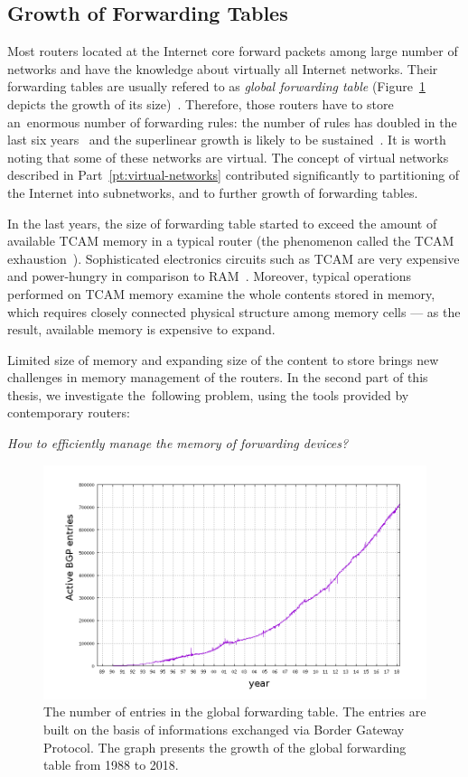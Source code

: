 \subsection{Growth of Forwarding Tables}

Most routers located at the Internet core forward packets among large number of networks and have the knowledge about virtually all Internet networks.
Their forwarding tables are usually refered to as \emph{global forwarding table} (Figure~\ref{fig:bgp-entries} depicts the growth of its size)~\cite{url-bgp-entries}.
Therefore, those routers have to store an~enormous number of forwarding rules: the
number of rules has doubled in the last six years~\cite{bgp-routeviews} and
the superlinear growth is likely to be sustained~\cite{steve-myth}.
It is worth noting that some of these networks are virtual.
The concept of virtual networks described in Part~\ref{pt:virtual-networks} contributed significantly to partitioning of the Internet into subnetworks, and to further growth of forwarding tables.

In the last years, the size of forwarding table started to exceed the amount of available TCAM memory in a typical router (the phenomenon called the TCAM exhaustion~\cite{tcam-exhaust}).
Sophisticated electronics circuits such as TCAM are very expensive and power-hungry in comparison to RAM~\cite{tcam-expensive}.
Moreover, typical operations performed on TCAM memory examine the whole contents stored in memory, which requires closely connected physical structure among memory cells --- as the result, available memory is expensive to expand.

Limited size of memory and expanding size of the content to store brings new challenges in memory management of the routers.
In the second part of this thesis, we investigate the~following problem, using the tools provided by contemporary routers:
\begin{center}
  \emph{How to efficiently manage the memory of forwarding devices?}
\end{center}

\begin{figure}[t]
\centering
\includegraphics[width=0.79\columnwidth]{figs/bgp-entries.png}
\caption{The number of entries in the global forwarding table. The entries are built on the basis of informations exchanged via Border Gateway Protocol. The graph presents the growth of the global forwarding table from 1988 to 2018.}\label{fig:bgp-entries}
\end{figure}


